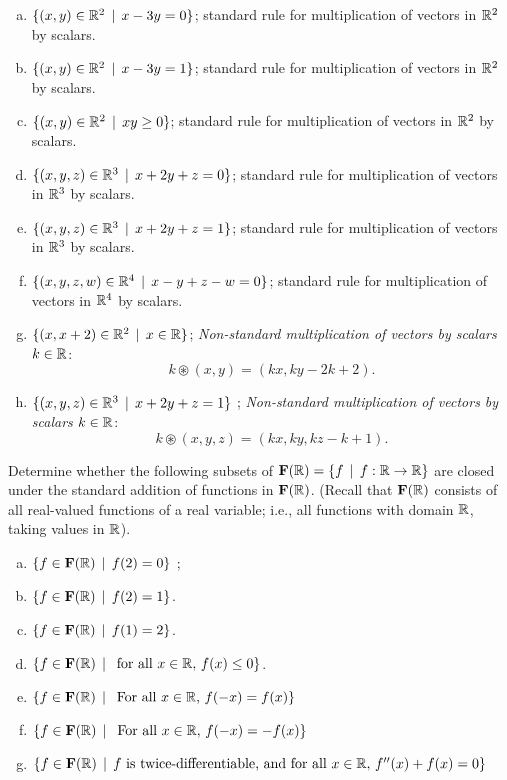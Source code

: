\begin{prob}
\begin{enumerate}[a)]
\item\sov  $\{(x, y) \in \mathbb{R}^2\,\mid \, x -3y=0  \}$;  standard rule for multiplication of vectors  in $\mathbb{R}^2$ by scalars.   \medskip
%
\item$\{(x, y) \in \mathbb{R}^2\,\mid \, x -3y=1  \}$; standard rule for multiplication of vectors  in $\mathbb{R}^2$ by scalars.\medskip
\item\sov  $\{(x, y) \in \mathbb{R}^2\,\mid \, xy \ge 0  \}$; standard rule for multiplication of vectors  in $\mathbb{R}^2$ by scalars.\medskip
%
 
\item  $\{(x, y, z) \in \mathbb{R}^3\,\mid \, x+2y+z=0  \}$; standard rule for multiplication of vectors  in $\mathbb{R}^3$ by scalars.\medskip \medskip
%
\item\sov  $\{(x, y, z) \in \mathbb{R}^3\,\mid \, x+2y+z=1  \}$; standard rule for multiplication of vectors  in $\mathbb{R}^3$ by scalars.\medskip 
%
\item  $\{(x, y, z, w) \in \mathbb{R}^4\,\mid \, x-y+z-w=0  \}$; standard rule for multiplication of vectors in  $\mathbb{R}^4$ by scalars.\medskip 
%
\item\sov  $\{(x, x+2) \in \mathbb{R}^2\,\mid \, x\in \mathbb{R} \}$; {\it Non-standard  multiplication of vectors  by  scalars $k\in \mathbb{R}$}: $$k\circledast (x,y)=(kx, ky-2k+2).$$   
%
\item  $\{(x, y, z) \in \mathbb{R}^3\,\mid \, x+2y+z=1  \}$ ; {\it Non-standard  multiplication of vectors  by  scalars $k\in \mathbb{R}$}: $$k\circledast (x,y,z)=(kx, ky, kz-k+1).$$
%
\end{enumerate} 


\end{prob} \begin{prob} \label{prob04.3}  Determine whether   the following subsets of $\mathbf{F}(\mathbb{R})=\{f \,\mid \, f: \mathbb{R} \to \mathbb{R} \}$ are closed under the standard addition of functions in  $\mathbf{F}(\mathbb{R})$. (Recall that $\mathbf{F}(\mathbb{R})$ consists of all real-valued functions of a real variable; i.e., all functions with domain $\mathbb{R}$, taking values in $\mathbb{R}$). 
\begin{enumerate}[a)]\medskip
\item  $\{f \in \mathbf{F}(\mathbb{R}) \,\mid \, f(2)=0  \}$ ; \medskip \medskip
%
\item\sov  $\{f \in \mathbf{F}(\mathbb{R}) \,\mid \, f(2)=1  \}$.\medskip \medskip
% 

\item  $\{f \in \mathbf{F}(\mathbb{R}) \,\mid \, f(1)=2  \}$.\medskip \medskip
%
\item\sov  $\{f \in \mathbf{F}(\mathbb{R}) \,\mid \, \text{ for all } x\in \mathbb{R},   \, f(x)\le 0 \}$.\medskip 
%
\item  $\{f \in \mathbf{F}(\mathbb{R}) \,\mid \, \text{ For all } x\in \mathbb{R},   \, f(-x)= f(x) \}$\medskip 
%
\item\sov  $\{f \in \mathbf{F}(\mathbb{R}) \,\mid \, \text{ For all } x\in \mathbb{R},   \, f(-x)= -f(x) \}$\medskip 
%
\item $\{f \in \mathbf{F}(\mathbb{R})   \,\mid \, \text{$f$ is twice-differentiable, and  for all } x\in \mathbb{R},   \, f''(x)+ f(x)=0 \}$ \medskip 
%
 

\end{enumerate}
\end{prob}
